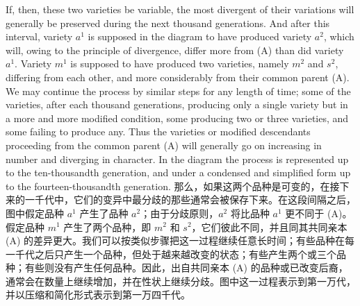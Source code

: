 \darwinpair
{If, then, these two varieties be variable, the most divergent of their variations will generally be preserved during the next thousand generations. And after this interval, variety $a^{1}$ is supposed in the diagram to have produced variety $a^{2}$, which will, owing to the principle of divergence, differ more from (A) than did variety $a^{1}$. Variety $m^{1}$ is supposed to have produced two varieties, namely $m^{2}$ and $s^{2}$, differing from each other, and more considerably from their common parent (A). We may continue the process by similar steps for any length of time; some of the varieties, after each thousand generations, producing only a single variety but in a more and more modified condition, some producing two or three varieties, and some failing to produce any. Thus the varieties or modified descendants proceeding from the common parent (A) will generally go on increasing in number and diverging in character. In the diagram the process is represented up to the ten-thousandth generation, and under a condensed and simplified form up to the fourteen-thousandth generation.}
{那么，如果这两个品种是可变的，在接下来的一千代中，它们的变异中最分歧的那些通常会被保存下来。在这段间隔之后，图中假定品种 $a^{1}$ 产生了品种 $a^{2}$；由于分歧原则，$a^{2}$ 将比品种 $a^{1}$ 更不同于 (A)。假定品种 $m^{1}$ 产生了两个品种，即 $m^{2}$ 和 $s^{2}$，它们彼此不同，并且同其共同亲本 (A) 的差异更大。我们可以按类似步骤把这一过程继续任意长时间；有些品种在每一千代之后只产生一个品种，但处于越来越改变的状态；有些产生两个或三个品种；有些则没有产生任何品种。因此，出自共同亲本 (A) 的品种或已改变后裔，通常会在数量上继续增加，并在性状上继续分歧。图中这一过程表示到第一万代，并以压缩和简化形式表示到第一万四千代。}

